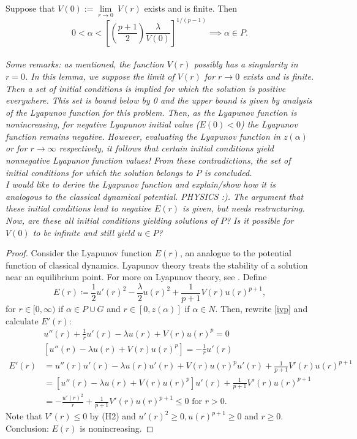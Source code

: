 \newpage
\begin{lemma}\label{lya}Suppose that $V(0):=\underset{r\to0}{\lim}~V(r)$ exists and is finite. Then $$0<\alpha<\left[\left(\frac{p+1}{2}\right)\frac{\lambda}{V(0)} \right]^{1/(p-1)}\implies \alpha\in P.$$\\
\emph{Some remarks: as mentioned, the function $V(r)$ possibly has a singularity in $r=0$. In this lemma, we suppose the limit of $V(r)$ for $r\to0$ exists and is finite. Then a set of initial conditions is implied for which the solution is positive everywhere. This set is bound below by 0 and the upper bound is given by analysis of the Lyapunov function for this problem. Then, as the Lyapunov function is nonincreasing, for negative Lyapunov initial value ($E(0)<0$) the Lyapunov function remains negative. However, evaluating the Lyapunov function in $z(\alpha)$ or for $r\to\infty$ respectively, it follows that certain initial conditions yield nonnegative Lyapunov function values! From these contradictions, the set of initial conditions for which the solution belongs to $P$ is concluded.}\\[11pt]
\emph{I would like to derive the Lyapunov function and explain/show how it is analogous to the classical dynamical potential. PHYSICS :). The argument that these initial conditions lead to negative $E(r)$ is given, but needs restructuring. Now, are these all initial conditions yielding solutions of $P$? Is it possible for $V(0)$ to be infinite and still yield $u\in P$?}

\begin{proof}
Consider the Lyapunov function $E(r)$, an analogue to the potential function of classical dynamics. Lyapunov theory treats the stability of a solution near an equilibrium point. For more on Lyapunov theory, see \cite{}. Define $$E(r)\coloneqq\frac{1}{2}u'(r)^2-\frac{\lambda}{2}u(r)^2+\frac{1}{p+1}V(r)u(r)^{p+1},$$  for $r\in[0,\infty)$ if $\alpha\in P\cup G$ and $r\in[0,z(\alpha)]$ if $\alpha\in N$. Then, rewrite \ref{ivp} and calculate $E'(r)$: \begin{align*} &u''(r)+\frac{1}{r}u'(r)-\lambda u(r)+V(r)u(r)^p=0\\
&\left[u''(r)-\lambda u(r)+V(r)u(r)^p\right]=-\frac{1}{r}u'(r)\\
E'(r)&=u''(r)u'(r)-\lambda u(r)u'(r)+V(r)u(r)^pu'(r)+\frac{1}{p+1}V'(r)u(r)^{p+1}\\
&=\left[u''(r)-\lambda u(r)+V(r)u(r)^p\right]u'(r)+\frac{1}{p+1}V'(r)u(r)^{p+1}\\
&=-\frac{u'(r)^2}{r}+\frac{1}{p+1}V'(r)u(r)^{p+1}\leq0\text{ for }r>0.
\end{align*} Note that $V'(r)\leq0$ by (H2) and $u'(r)^2\geq0, u(r)^{p+1}\geq0$ and $r\geq0$. Conclusion: $E(r)$ is nonincreasing.


\end{proof}
\end{lemma}
